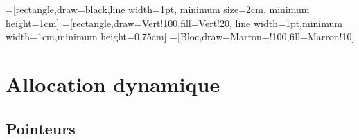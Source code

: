 
=[rectangle,draw=black,line width=1pt, minimum size=2cm,
minimum height=1cm]
=[rectangle,draw=Vert!100,fill=Vert!20,
    line width=1pt,minimum width=1cm,minimum height=0.75cm]
=[Bloc,draw=Marron=!100,fill=Marron!10]

\section{Allocation dynamique}

\subsection{Pointeurs}

